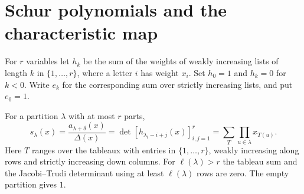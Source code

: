 \section{Schur polynomials and the characteristic map}

For \(r\) variables let \(h_k\) be the sum of the weights of weakly
increasing lists of length \(k\) in \(\{1,\ldots,r\}\), where a letter
\(i\) has weight \(x_i\). Set \(h_0=1\) and \(h_k=0\) for \(k<0\).
Write \(e_k\) for the corresponding sum over strictly increasing lists,
and put \(e_0=1\).

\begin{theorem}\label{res:C04}
For a partition \(\lambda\) with at most \(r\) parts,
\[
 s_\lambda(x)
 =\frac{a_{\lambda+\delta}(x)}{\Delta(x)}
 =\det[h_{\lambda_i-i+j}(x)]_{i,j=1}^r
 =\sum_T \prod_{u\in\lambda}x_{T(u)} .
\]
Here \(T\) ranges over the tableaux with entries in
\(\{1,\ldots,r\}\), weakly increasing along rows and strictly
increasing down columns. For \(\ell(\lambda)>r\) the tableau sum and
the Jacobi--Trudi determinant using at least \(\ell(\lambda)\) rows
are zero. The empty partition gives \(1\).
\end{theorem}

